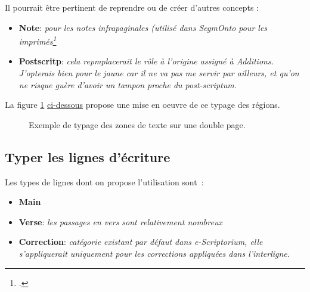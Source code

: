 \documentclass[a4paper,12pt,twoside]{book}
\newcommand{\langue}[1]{\emph{#1}}
\begin{document}
			
			Il pourrait être pertinent de reprendre ou de créer d'autres concepts :
			\begin{itemize}
				\item \textbf{Note}: \langue{pour les notes infrapaginales (utilisé dans SegmOnto pour les imprimés\selectlanguage{french}\footcite{Imprimes2021}}
				\item \textbf{Postscritp}: \langue{cela repmplacerait le rôle à l'origine assigné à \langue{Additions}. J'opterais bien pour le jaune car il ne va pas me servir par ailleurs, et qu'on ne risque guère d'avoir un tampon proche du post-scriptum}.
				
			\end{itemize}
			
			La figure \ref{typageRegions} \hyperref[typageRegions]{ci-dessous} propose une mise en oeuvre de ce typage des régions.	

	        \begin{figure}[!h]
	        	\centering
			\caption{Exemple de typage des zones de texte sur une double page.}%
			\label{typageRegions}%
	        \end{figure}
        
            \subsection{Typer les lignes d'écriture}
            Les types de lignes dont on propose l'utilisation sont~:
            
            \begin{itemize}
				\item \textbf{Main}
				\item \textbf{Verse}: \langue{les passages en vers sont relativement nombreux}
				\item \textbf{Correction}: \langue{catégorie existant par défaut dans e-Scriptorium, elle s'appliquerait uniquement pour les corrections appliquées dans l'interligne.}
            \end{itemize}
        
\end{document}
